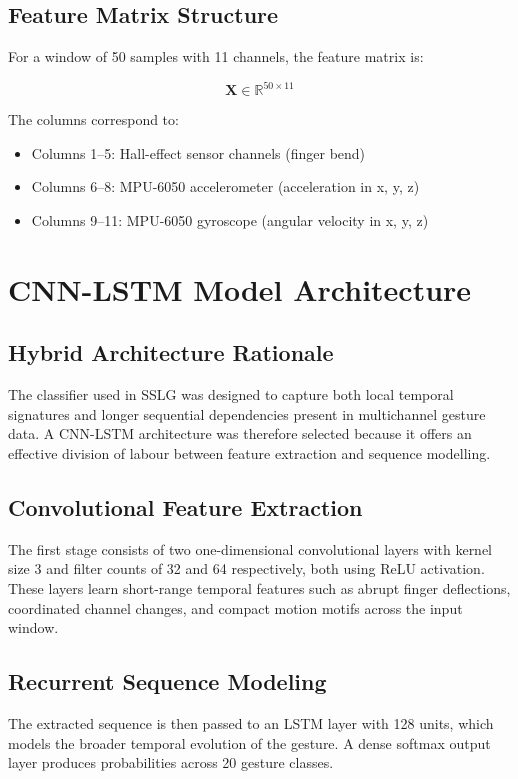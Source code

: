 \documentclass[12pt,a4paper]{report}
\begin{document}
\subsection{Feature Matrix Structure}
For a window of 50 samples with 11 channels, the feature matrix is:

\begin{equation}
\mathbf{X} \in \mathbb{R}^{50 \times 11}
\end{equation}

\noindent The columns correspond to:
\begin{itemize}
  \item Columns 1--5: Hall-effect sensor channels (finger bend)
  \item Columns 6--8: MPU-6050 accelerometer (acceleration in x, y, z)
  \item Columns 9--11: MPU-6050 gyroscope (angular velocity in x, y, z)
\end{itemize}

\section{CNN-LSTM Model Architecture}
\label{sec:impl_model}

\subsection{Hybrid Architecture Rationale}
The classifier used in SSLG was designed to capture both local temporal signatures and longer sequential dependencies present in multichannel gesture data. A CNN-LSTM architecture was therefore selected because it offers an effective division of labour between feature extraction and sequence modelling.

\subsection{Convolutional Feature Extraction}
The first stage consists of two one-dimensional convolutional layers with kernel size 3 and filter counts of 32 and 64 respectively, both using ReLU activation. These layers learn short-range temporal features such as abrupt finger deflections, coordinated channel changes, and compact motion motifs across the input window.

\subsection{Recurrent Sequence Modeling}
The extracted sequence is then passed to an LSTM layer with 128 units, which models the broader temporal evolution of the gesture. A dense softmax output layer produces probabilities across 20 gesture classes.
\end{document}
